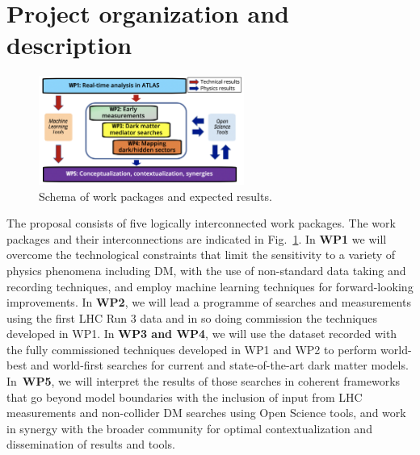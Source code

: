 \documentclass[11pt,a4paper]{article}
\begin{document}

\section{Project organization and description} 
\smallskip


\begin{figure} 
\begin{center}
\includegraphics[width=0.6\textwidth]{figs/WPs_shorter}
\caption{\label{fig:WPs} \footnotesize Schema of work packages and expected results.
}
\end{center}

\vskip10pt
\end{figure}

The proposal consists of five logically interconnected work packages.
The work packages and their interconnections are indicated in Fig.~\ref{fig:WPs}. 
In \textbf{WP1} we will overcome the technological constraints that limit the sensitivity to a variety of physics phenomena including DM, with the use of non-standard data taking and recording techniques, and employ machine learning techniques for forward-looking improvements. 
In \textbf{WP2}, we will lead a programme of searches and measurements using the first LHC Run 3 data and in so doing commission the techniques developed in WP1. 
In \textbf{WP3 and WP4}, we will use the dataset recorded with the fully commissioned techniques developed in WP1 and WP2 to perform world-best and world-first searches for current and state-of-the-art dark matter models. 
In~\textbf{WP5}, we will interpret the results of those searches in coherent frameworks that go beyond model boundaries with the inclusion of input from LHC measurements and non-collider DM searches using Open Science tools, and work in synergy with the broader community for optimal contextualization and dissemination of results and tools. %
\end{document}
